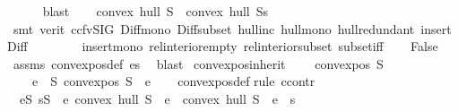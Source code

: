\begin{isabellebody}
\ \ \ \ \isamarkupfalse%
\ blast\isanewline
\ \ \isamarkupfalse%
\ {\isachardoublequoteopen}convex\ hull\ S\ {\isacharequal}{\kern0pt}\ convex\ hull\ {\isacharparenleft}{\kern0pt}S{\isacharminus}{\kern0pt}{\isacharbraceleft}{\kern0pt}s{\isacharbraceright}{\kern0pt}{\isacharparenright}{\kern0pt}{\isachardoublequoteclose}\isanewline
\ \ \ \ \isamarkupfalse%
\ {\isacharparenleft}{\kern0pt}smt\ {\isacharparenleft}{\kern0pt}verit{\isacharcomma}{\kern0pt}\ ccfv{\isacharunderscore}{\kern0pt}SIG{\isacharparenright}{\kern0pt}\ Diff{\isacharunderscore}{\kern0pt}mono\ Diff{\isacharunderscore}{\kern0pt}subset\ hull{\isacharunderscore}{\kern0pt}inc\ hull{\isacharunderscore}{\kern0pt}mono\ hull{\isacharunderscore}{\kern0pt}redundant\ insert{\isacharunderscore}{\kern0pt}Diff\isanewline
\ \ \ \ \ \ \ \ insert{\isacharunderscore}{\kern0pt}mono\ rel{\isacharunderscore}{\kern0pt}interior{\isacharunderscore}{\kern0pt}empty\ rel{\isacharunderscore}{\kern0pt}interior{\isacharunderscore}{\kern0pt}subset\ subset{\isacharunderscore}{\kern0pt}iff{\isacharparenright}{\kern0pt}\isanewline
\ \ \isamarkupfalse%
\ False\ \isamarkupfalse%
\ assms\ convex{\isacharunderscore}{\kern0pt}pos{\isacharunderscore}{\kern0pt}def\ es{\isacharparenleft}{\kern0pt}{}{\isacharparenright}{\kern0pt}\ \isamarkupfalse%
\ blast\isanewline
{}\isamarkupfalse%
%
\endisatagproof
{\isafoldproof}%
%
\isadelimproof
\isanewline
%
\endisadelimproof
\isanewline
{}\isamarkupfalse%
\ convex{\isacharunderscore}{\kern0pt}pos{\isacharunderscore}{\kern0pt}inherit{}{\isacharcolon}{\kern0pt}\ \isanewline
\ \ \ {\isachardoublequoteopen}convex{\isacharunderscore}{\kern0pt}pos\ S{\isachardoublequoteclose}\isanewline
\ \ \ {\isachardoublequoteopen}{\isasymforall}\ e\ {\isasymin}\ S{\isachardot}{\kern0pt}\ convex{\isacharunderscore}{\kern0pt}pos\ {\isacharparenleft}{\kern0pt}S\ {\isacharminus}{\kern0pt}\ {\isacharbraceleft}{\kern0pt}e{\isacharbraceright}{\kern0pt}{\isacharparenright}{\kern0pt}{\isachardoublequoteclose}\isanewline
%
\isadelimproof
\ \ %
\endisadelimproof
%
\isatagproof
{}\isamarkupfalse%
\ convex{\isacharunderscore}{\kern0pt}pos{\isacharunderscore}{\kern0pt}def\isanewline
{}\isamarkupfalse%
{\isacharparenleft}{\kern0pt}rule\ ccontr{\isacharparenright}{\kern0pt}\isanewline
\ \ \isamarkupfalse%
\ {\isachardoublequoteopen}{\isasymnot}\ {\isacharparenleft}{\kern0pt}{\isasymforall}e{\isasymin}S{\isachardot}{\kern0pt}\ {\isasymforall}s{\isasymin}S\ {\isacharminus}{\kern0pt}\ {\isacharbraceleft}{\kern0pt}e{\isacharbraceright}{\kern0pt}{\isachardot}{\kern0pt}\ convex\ hull\ {\isacharparenleft}{\kern0pt}S\ {\isacharminus}{\kern0pt}\ {\isacharbraceleft}{\kern0pt}e{\isacharbraceright}{\kern0pt}{\isacharparenright}{\kern0pt}\ {\isasymnoteq}\ convex\ hull\ {\isacharparenleft}{\kern0pt}S\ {\isacharminus}{\kern0pt}\ {\isacharbraceleft}{\kern0pt}e{\isacharbraceright}{\kern0pt}\ {\isacharminus}{\kern0pt}\ {\isacharbraceleft}{\kern0pt}s{\isacharbraceright}{\kern0pt}{\isacharparenright}{\kern0pt}{\isacharparenright}{\kern0pt}{\isachardoublequoteclose}\isanewline

\end{isabellebody}
